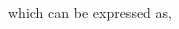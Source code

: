 \documentclass[10pt,a4paper]{report}
\newcommand{\myvec}[1]{\ensuremath{\begin{pmatrix}#1\end{pmatrix}}}
\let\vec\mathbf
\let\vec\mathbf
\begin{document}
\begin{multicols}{2}
{     %
which can be expressed as,

}
\end{multicols}
\end{document}
